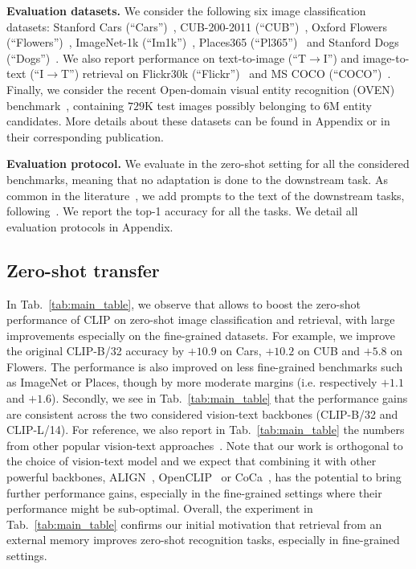 \vspace{-0.1cm}
\noindent\textbf{Evaluation datasets.}
We consider the following six image classification datasets:
Stanford Cars (``Cars'')~\cite{krause20133d},
CUB-200-2011 (``CUB'')~\cite{wah2011caltech},
Oxford Flowers (``Flowers'')~\cite{nilsback2008automated},
ImageNet-1k (``Im1k'')~\cite{russakovsky2015imagenet},
Places365 (``Pl365'')~\cite{zhou2017places} and
Stanford Dogs (``Dogs'')~\cite{KhoslaYaoJayadevaprakashFeiFei_FGVC2011}.
We also report performance on text-to-image (``T$\rightarrow$I'') and image-to-text (``I$\rightarrow$T'') retrieval on Flickr30k (``Flickr'')~\cite{plummer2015flickr30k} and MS COCO (``COCO'')~\cite{lin2014microsoft}.
Finally, we consider the recent Open-domain visual entity recognition (OVEN) benchmark~\cite{hu2023open}, containing $729$K test images possibly belonging to $6$M entity candidates.
More details about these datasets can be found in Appendix or in their corresponding publication.

\vspace{-0.1cm}
\noindent\textbf{Evaluation protocol.}
We evaluate in the zero-shot setting for all the considered benchmarks, meaning that no adaptation is done to the downstream task.
As common in the literature~\cite{radford2021learning,jia2021scaling,singh2022flava,zhai2022lit}, we add prompts to the text of the downstream tasks, following~\cite{zhai2022lit}.
We report the top-1 accuracy for all the tasks.
We detail all evaluation protocols in Appendix.

\vspace{-0.2cm}
\subsection{Zero-shot transfer}
\vspace{-0.2cm}
In Tab.~\ref{tab:main_table}, we observe that \OURS allows to boost the zero-shot performance of CLIP on zero-shot image classification and retrieval, with large improvements especially on the fine-grained datasets.
For example, we improve the original CLIP-B/32 accuracy by $+10.9$ on Cars,  $+10.2$ on CUB and $+5.8$ on Flowers.
The performance is also improved on less fine-grained benchmarks such as ImageNet or Places, though by more moderate margins (i.e. respectively $+1.1$ and $+1.6$).
Secondly, we see in Tab.~\ref{tab:main_table} that the performance gains are consistent across the two considered vision-text backbones (CLIP-B/32 and CLIP-L/14).
For reference, we also report in Tab.~\ref{tab:main_table} the numbers from other popular vision-text approaches~\cite{singh2022flava,jia2021scaling,zhai2022lit,pali2022}.
Note that our work is orthogonal to the choice of vision-text model and we expect that combining it with other powerful backbones, \eg ALIGN~\cite{jia2021scaling}, OpenCLIP~\cite{cherti2022reproducible} or CoCa~\cite{yu2022coca}, has the potential to bring further performance gains, especially in the fine-grained settings where their performance might be sub-optimal.
Overall, the experiment in Tab.~\ref{tab:main_table} confirms our initial motivation that retrieval from an external memory improves zero-shot recognition tasks, especially in fine-grained settings.

